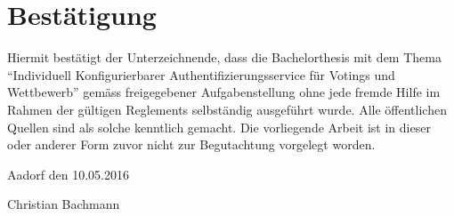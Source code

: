 \newpage

\chapter{Bestätigung}\label{bestuxe4tigung}

Hiermit bestätigt der Unterzeichnende, dass die Bachelorthesis mit dem
Thema ``Individuell Konfigurierbarer Authentifizierungsservice für
Votings und Wettbewerb'' gemäss freigegebener Aufgabenstellung ohne jede
fremde Hilfe im Rahmen der gültigen Reglements selbständig ausgeführt
wurde. Alle öffentlichen Quellen sind als solche kenntlich gemacht. Die
vorliegende Arbeit ist in dieser oder anderer Form zuvor nicht zur
Begutachtung vorgelegt worden.

Aadorf den 10.05.2016

Christian Bachmann





